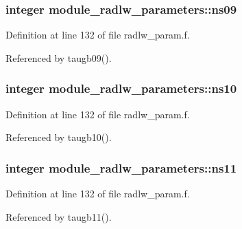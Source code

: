 \subsubsection[{\texorpdfstring{ns09}{ns09}}]{\setlength{\rightskip}{0pt plus 5cm}integer module\+\_\+radlw\+\_\+parameters\+::ns09}\hypertarget{namespacemodule__radlw__parameters_a8948c9fe0a0f209c62e17e7c526940b8}{}\label{namespacemodule__radlw__parameters_a8948c9fe0a0f209c62e17e7c526940b8}


Definition at line 132 of file radlw\+\_\+param.\+f.



Referenced by taugb09().

\subsubsection[{\texorpdfstring{ns10}{ns10}}]{\setlength{\rightskip}{0pt plus 5cm}integer module\+\_\+radlw\+\_\+parameters\+::ns10}\hypertarget{namespacemodule__radlw__parameters_a66d1bbe720448a035ccf689d77418cd5}{}\label{namespacemodule__radlw__parameters_a66d1bbe720448a035ccf689d77418cd5}


Definition at line 132 of file radlw\+\_\+param.\+f.



Referenced by taugb10().

\subsubsection[{\texorpdfstring{ns11}{ns11}}]{\setlength{\rightskip}{0pt plus 5cm}integer module\+\_\+radlw\+\_\+parameters\+::ns11}\hypertarget{namespacemodule__radlw__parameters_ace01958b71c7f6923fd9b3ba39b3b668}{}\label{namespacemodule__radlw__parameters_ace01958b71c7f6923fd9b3ba39b3b668}


Definition at line 132 of file radlw\+\_\+param.\+f.



Referenced by taugb11().

